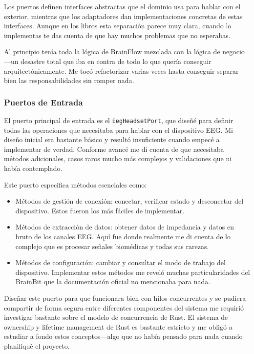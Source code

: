 Los puertos definen interfaces abstractas que el dominio usa para hablar con el exterior, mientras que los adaptadores dan implementaciones concretas de estas interfaces. Aunque en los libros esta separación parece muy clara, cuando lo implementas te das cuenta de que hay muchos problemas que no esperabas.

Al principio tenía toda la lógica de BrainFlow mezclada con la lógica de negocio—un desastre total que iba en contra de todo lo que quería conseguir arquitectónicamente. Me tocó refactorizar varias veces hasta conseguir separar bien las responsabilidades sin romper nada.

\subsubsection{Puertos de Entrada}

El puerto principal de entrada es el \texttt{EegHeadsetPort}, que diseñé para definir todas las operaciones que necesitaba para hablar con el dispositivo EEG. Mi diseño inicial era bastante básico y resultó insuficiente cuando empecé a implementar de verdad. Conforme avancé me di cuenta de que necesitaba métodos adicionales, casos raros mucho más complejos y validaciones que ni había contemplado.

Este puerto especifica métodos esenciales como:

\begin{itemize}
    \item Métodos de gestión de conexión: conectar, verificar estado y desconectar del dispositivo. Estos fueron los más fáciles de implementar.
    \item Métodos de extracción de datos: obtener datos de impedancia y datos en bruto de los canales EEG. Aquí fue donde realmente me di cuenta de lo complejo que es procesar señales biomédicas y todas sus rarezas.
    \item Métodos de configuración: cambiar y consultar el modo de trabajo del dispositivo. Implementar estos métodos me reveló muchas particularidades del BrainBit que la documentación oficial no mencionaba para nada.
\end{itemize}

Diseñar este puerto para que funcionara bien con hilos concurrentes y se pudiera compartir de forma segura entre diferentes componentes del sistema me requirió investigar bastante sobre el modelo de concurrencia de Rust. El sistema de ownership y lifetime management de Rust es bastante estricto y me obligó a estudiar a fondo estos conceptos—algo que no había pensado para nada cuando planifiqué el proyecto.

